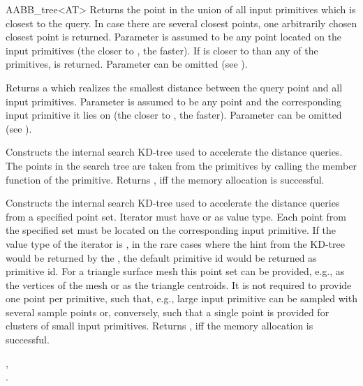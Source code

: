 \begin{ccRefClass}{AABB_tree<AT>}
{Returns the point in the union of all input primitives which is closest to the query. In case there are several closest points, one arbitrarily chosen closest point is returned. Parameter  is assumed to be any point located on the input primitives (the closer  to , the faster). If  is closer to  than any of the primitives,  is returned. Parameter  can be omitted (see ). }

{Returns a  which realizes the smallest distance between the query point and all input primitives. Parameter  is assumed to be any point and the corresponding input primitive it lies on (the closer  to , the faster). Parameter  can be omitted (see ).}




{ Constructs the internal search KD-tree used to accelerate the distance queries. The points in the search tree are taken from the primitives by calling the member function  of the primitive. Returns , iff the memory allocation is successful.}

\begin{ccAdvanced}
{ Constructs the internal search KD-tree used to accelerate the distance queries from a specified point set. Iterator  must have  or  as value type. Each point from the specified  set must be located on the corresponding input primitive. If the value type of the iterator is , in the rare cases where the hint from the KD-tree would be returned by the , the default primitive id would be returned as primitive id. For a triangle surface mesh this point set can be provided, e.g., as the vertices of the mesh or as the triangle centroids. It is not required to provide one point per primitive, such that, e.g., large input primitive can be sampled with several sample points or, conversely, such that a single point is provided for clusters of small input primitives. Returns , iff the memory allocation is successful.}
\end{ccAdvanced}

\ccSeeAlso

, \\
.

\end{ccRefClass}

\ccRefPageEnd

